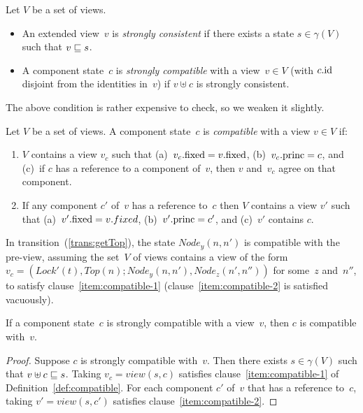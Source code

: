 \begin{definition}
Let $V$ be a set of views.
\begin{itemize}
\item An extended view~$v$ is \emph{strongly consistent} if there exists a
  state $s \in \gamma(V)$ such that $v \sqsubseteq s$. 

\item A component state~$c$ is \emph{strongly compatible} with a view~$v \in
  V$ (with $c.\mathrm{id}$ disjoint from the identities in~$v$) if $v \uplus c$ is
  strongly consistent.
\end{itemize}
\end{definition}


The above condition is rather expensive to check, so we weaken it slightly. 
%
\begin{definition}
\label{def:compatible}
Let $V$ be a set of views.  A component state~$c$ is \emph{compatible} with a
view $v \in V$ if:
%
\begin{enumerate}
\item\label{item:compatible-1} $V$ contains a view $v_c$ such that
  (a)~$v_c.\mathrm{fixed} = v.\mathrm{fixed}$, (b)~$v_c.\mathrm{princ} = c$, and (c)~if $c$ has a
  reference to a component of~$v$, then $v$ and~$v_c$ agree on that component.

\item\label{item:compatible-2} If any component $c'$ of~$v$ has a reference
  to~$c$ then $V$ contains a view $v'$ such that (a)~$v'.\mathrm{fixed} = v.fixed$,
  (b)~$v'.\mathrm{princ} = c'$, and (c)~$v'$ contains $c$.
\end{enumerate}
\end{definition}

In transition~(\ref{trans:getTop}), the state $Node_y(n, n')$ is compatible
with the pre-view, assuming the set~$V$ of views contains a view of the form
$v_c = (Lock'(t), Top(n); Node_y(n, n'), Node_z(n', n''))$ for some~$z$
and~$n''$, to satisfy clause~\ref{item:compatible-1}
(clause~\ref{item:compatible-2} is satisfied vacuously).


\begin{lemma}
If a component state~$c$ is strongly compatible with a view~$v$, then
$c$ is compatible with~$v$. 
\end{lemma}
%
\begin{proof}
Suppose $c$ is strongly compatible with~$v$.  Then there exists $s \in
\gamma(V)$ such that $v \uplus c \sqsubseteq s$.  Taking $v_c = view(s, c)$
satisfies clause~\ref{item:compatible-1} of Definition~\ref{def:compatible}.
For each component $c'$ of~$v$ that has a reference to~$c$, taking $v' =
view(s,c')$ satisfies clause~\ref{item:compatible-2}.
\end{proof}


